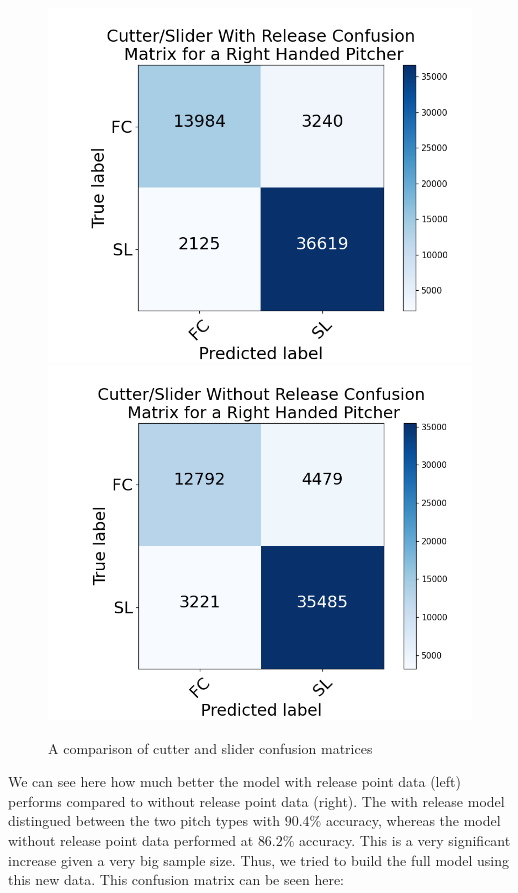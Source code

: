 \documentclass{article}
\begin{document}
\begin{center}
  \begin{figure} [h!]
    \includegraphics[scale = .14]{CSR-R.png} \includegraphics[scale = .14]{CSNR-R.png}
    \caption{A comparison of cutter and slider confusion matrices}
  \end{figure}
\end{center}

We can see here how much better the model with release point data (left) performs compared to without
release point data (right). The with release model distingued between the two pitch types with $90.4\%$
accuracy, whereas the model without release point data performed at $86.2\%$ accuracy. This is a very 
significant increase given a very big sample size. Thus, we tried to build the full model
using this new data. This confusion matrix can be seen here:
\end{document}
